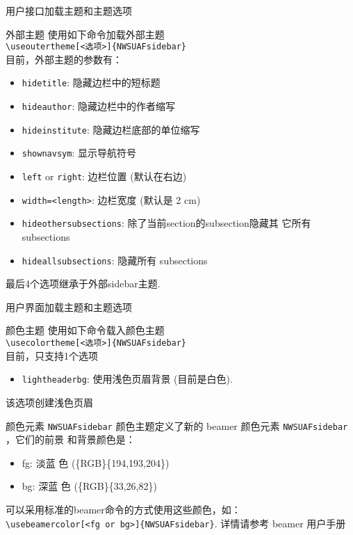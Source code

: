 \begin{frame}{用户接口}{加载主题和主题选项}
  \begin{block}{外部主题}
    使用如下命令加载外部主题\\
    {\tt \textbackslash useoutertheme[<选项>]\{NWSUAFsidebar\}}\\
    目前，外部主题的参数有：
    \begin{itemize}
      \scriptsize
    \item {\tt hidetitle}: 隐藏边栏中的短标题
    \item {\tt hideauthor}: 隐藏边栏中的作者缩写
    \item {\tt hideinstitute}: 隐藏边栏底部的单位缩写
    \item {\tt shownavsym}: 显示导航符号
    \item {\tt left} or {\tt right}: 边栏位置 (默认在右边)
    \item {\tt width=<length>}: 边栏宽度 (默认是 2 cm)
    \item {\tt hideothersubsections}: 除了当前section的subsection隐藏其
      它所有 subsections
    \item {\tt hideallsubsections}: 隐藏所有 subsections
    \end{itemize}
    最后4个选项继承于外部sidebar主题.
  \end{block}
\end{frame}

\begin{frame}[allowframebreaks]{用户界面}{加载主题和主题选项}
  \begin{block}{颜色主题}
    使用如下命令载入颜色主题\\
    {\tt \textbackslash usecolortheme[<选项>]\{NWSUAFsidebar\}}\\
    目前，只支持1个选项
    \begin{itemize}
    \item {\tt lightheaderbg}: 使用浅色页眉背景 (目前是白色).
    \end{itemize}
    该选项创建浅色页眉
  \end{block}
  \pause
  \begin{block}{颜色元素 {\tt NWSUAFsidebar}}
    颜色主题定义了新的 beamer 颜色元素 {\tt NWSUAFsidebar} ，它们的前景
    和背景颜色是：
    \begin{itemize}
    \item fg: {淡蓝
        色 (\{RGB\}\{194,193,204\})}
    \item bg: {深蓝
        色 (\{RGB\}\{33,26,82\})}
    \end{itemize}
    可以采用标准的beamer命令的方式使用这些颜色，如：\\
    {\tt \textbackslash usebeamercolor[<fg or
      bg>]\{NWSUAFsidebar\}}. 详情请参考 beamer 用户手册
  \end{block}
\end{frame}

